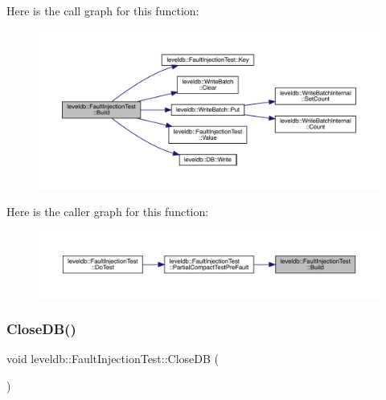 Here is the call graph for this function\+:
\nopagebreak
\begin{figure}[H]
\begin{center}
\leavevmode
\includegraphics[width=350pt]{classleveldb_1_1_fault_injection_test_aa387332893f14da9bdec0751e151f282_cgraph}
\end{center}
\end{figure}
Here is the caller graph for this function\+:
\nopagebreak
\begin{figure}[H]
\begin{center}
\leavevmode
\includegraphics[width=350pt]{classleveldb_1_1_fault_injection_test_aa387332893f14da9bdec0751e151f282_icgraph}
\end{center}
\end{figure}
\mbox{\label{classleveldb_1_1_fault_injection_test_ab0290ce2456f04e5309165196369e834}} 
\subsubsection{\texorpdfstring{CloseDB()}{CloseDB()}}
{\footnotesize\ttfamily void leveldb\+::\+Fault\+Injection\+Test\+::\+Close\+DB (\begin{DoxyParamCaption}{ }\end{DoxyParamCaption})\hspace{0.3cm}{\ttfamily [inline]}}

